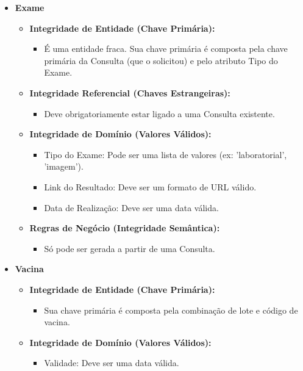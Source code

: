 \documentclass[12pt, a4paper]{article}
\begin{document}
\begin{itemize}
\item \textbf{Exame}
    \begin{itemize}
        \item \textbf{Integridade de Entidade (Chave Primária):}
        \begin{itemize}
            \item É uma entidade fraca. Sua chave primária é composta pela chave primária da Consulta (que o solicitou) e pelo atributo Tipo do Exame.
        \end{itemize}
        \item \textbf{Integridade Referencial (Chaves Estrangeiras):}
        \begin{itemize}
            \item Deve obrigatoriamente estar ligado a uma Consulta existente.
        \end{itemize}
        \item \textbf{Integridade de Domínio (Valores Válidos):}
        \begin{itemize}
            \item Tipo do Exame: Pode ser uma lista de valores (ex: 'laboratorial', 'imagem').
            \item Link do Resultado: Deve ser um formato de URL válido.
            \item Data de Realização: Deve ser uma data válida.
        \end{itemize}
        \item \textbf{Regras de Negócio (Integridade Semântica):}
        \begin{itemize}
            \item Só pode ser gerada a partir de uma Consulta.
        \end{itemize}
    \end{itemize}

    \item \textbf{Vacina}
    \begin{itemize}
        \item \textbf{Integridade de Entidade (Chave Primária):}
        \begin{itemize}
            \item Sua chave primária é composta pela combinação de lote e código de vacina.
        \end{itemize}
        \item \textbf{Integridade de Domínio (Valores Válidos):}
        \begin{itemize}
            \item Validade: Deve ser uma data válida.
        \end{itemize}
    \end{itemize}


\end{itemize}
\end{document}
